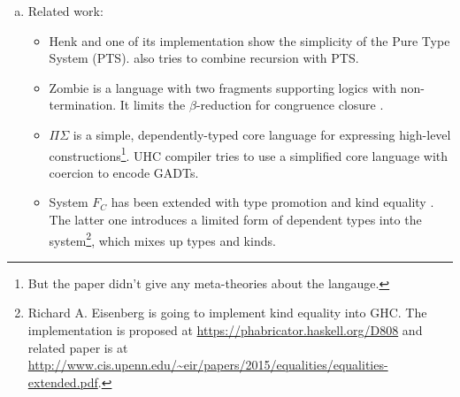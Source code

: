 \begin{enumerate}[a)]
\begin{itemize}
\end{itemize}

\item Related work:

\begin{itemize}
\item Henk \cite{pts:henk} and one of its implementation \cite{pts:fp} show the simplicity of the Pure Type System (PTS). \cite{pts:rec} also tries to combine recursion with PTS.

\item \textsf{Zombie} \cite{zombie:popl14, zombie:thesis} is a language with two fragments supporting logics with non-termination. It limits the $\beta$-reduction for congruence closure \cite{zombie:popl15}.

\item $\Pi\Sigma$ \cite{dep:pisigma} is a simple, dependently-typed core language for expressing high-level constructions\footnote{But the paper didn't give any meta-theories about the langauge.}. UHC compiler \cite{fc:uhc} tries to use a simplified core language with coercion to encode GADTs.

\item System $F_C$ \cite{fc} has been extended with type promotion \cite{fc:pro} and kind equality \cite{fc:kind}. The latter one introduces a limited form of dependent types into the system\footnote{Richard A. Eisenberg is going to implement kind equality \cite{fc:kind} into GHC. The implementation is proposed at \url{https://phabricator.haskell.org/D808} and related paper is at \url{http://www.cis.upenn.edu/~eir/papers/2015/equalities/equalities-extended.pdf}.}, which mixes up types and kinds.
\end{itemize}

\end{enumerate}
